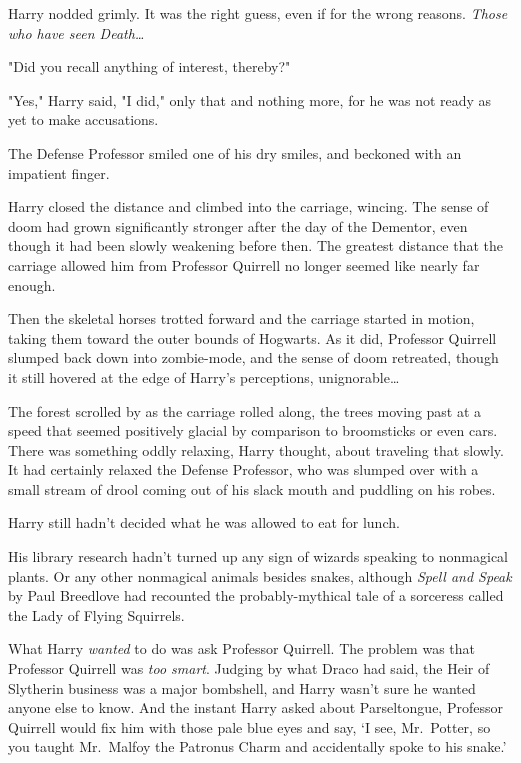 Harry nodded grimly. It was the right guess, even if for the wrong reasons. 
\emph{Those who have seen Death{\ldots}}

"Did you recall anything of interest, thereby?"

"Yes," Harry said, "I did," only that and nothing more, for he was not ready as 
yet to make accusations.

The Defense Professor smiled one of his dry smiles, and beckoned with an 
impatient finger.

Harry closed the distance and climbed into the carriage, wincing. The sense of 
doom had grown significantly stronger after the day of the Dementor, even 
though it had been slowly weakening before then. The greatest distance that the 
carriage allowed him from Professor Quirrell no longer seemed like nearly far 
enough.

Then the skeletal horses trotted forward and the carriage started in motion, 
taking them toward the outer bounds of Hogwarts. As it did, Professor Quirrell 
slumped back down into zombie-mode, and the sense of doom retreated, though it 
still hovered at the edge of Harry's perceptions, unignorable{\ldots}

The forest scrolled by as the carriage rolled along, the trees moving past at a 
speed that seemed positively glacial by comparison to broomsticks or even cars. 
There was something oddly relaxing, Harry thought, about traveling that slowly. 
It had certainly relaxed the Defense Professor, who was slumped over with a 
small stream of drool coming out of his slack mouth and puddling on his robes.

Harry still hadn't decided what he was allowed to eat for lunch.

His library research hadn't turned up any sign of wizards speaking to 
nonmagical plants. Or any other nonmagical animals besides snakes, although 
\emph{Spell and Speak} by Paul Breedlove had recounted the probably-mythical 
tale of a sorceress called the Lady of Flying Squirrels.

What Harry \emph{wanted} to do was ask Professor Quirrell. The problem was that 
Professor Quirrell was \emph{too smart}. Judging by what Draco had said, the 
Heir of Slytherin business was a major bombshell, and Harry wasn't sure he 
wanted anyone else to know. And the instant Harry asked about Parseltongue, 
Professor Quirrell would fix him with those pale blue eyes and say, `I see, 
Mr.~Potter, so you taught Mr.~Malfoy the Patronus Charm and accidentally spoke 
to his snake.'

